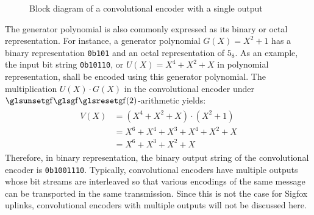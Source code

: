 \begin{figure}[h]
	\centering
	\caption{Block diagram of a convolutional encoder with a single output}
	\label{fig:convcoder}
\end{figure}

The generator polynomial is also commonly expressed as its binary or octal representation.
For instance, a generator polynomial $G(X) = X^2 + 1$ has a binary representation \texttt{0b101} and an octal representation of $5_8$.
As an example, the input bit string \texttt{0b10110}, or \mbox{$U(X) = X^4 + X^2 + X$} in polynomial representation, shall be encoded using this generator polynomial.
The multiplication $U(X) \cdot G(X)$ in the convolutional encoder under $\GF(2)$-arithmetic yields:
\begin{align}
\begin{split}
	V(X)	&= (X^4 + X^2 + X) \cdot (X^2 + 1) \\
		&= X^6 + X^4 + X^3 + X^4 + X^2 + X \\
		&= X^6 + X^3 + X^2 + X
\end{split}
\end{align}
Therefore, in binary representation, the binary output string of the convolutional encoder is \texttt{0b1001110}.
Typically, convolutional encoders have multiple outputs whose bit streams are interleaved so that various encodings of the same message can be transported in the same transmission.
Since this is not the case for Sigfox uplinks, convolutional encoders with multiple outputs will not be discussed here.

